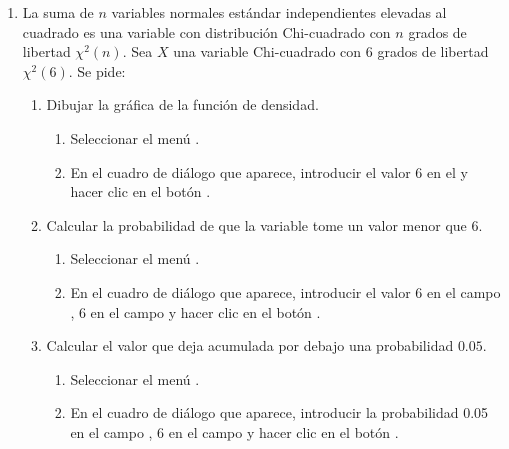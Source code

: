\begin{enumerate}[leftmargin=*]
\item La suma de $n$ variables normales estándar independientes elevadas al cuadrado es una variable con distribución Chi-cuadrado con $n$
grados de libertad $\chi^2(n)$. 
Sea $X$ una variable Chi-cuadrado con 6 grados de libertad $\chi^2(6)$. 
Se pide:
\begin{enumerate}
\item Dibujar la gráfica de la función de densidad. 
\begin{indicacion}{
\begin{enumerate}
\item Seleccionar el menú .
\item En el cuadro de diálogo que aparece, introducir el valor 6 en el  y hacer clic en el
botón .
\end{enumerate}}
\end{indicacion}

\item Calcular la probabilidad de que la variable tome un valor menor que 6.
\begin{indicacion}{
\begin{enumerate}
\item Seleccionar el menú .
\item En el cuadro de diálogo que aparece, introducir el valor $6$ en el campo , 6 en
el campo  y hacer clic en el botón .
\end{enumerate}}
\end{indicacion}

\item Calcular el valor que deja acumulada por debajo una probabilidad $0.05$.
\begin{indicacion}{
\begin{enumerate}
\item Seleccionar el menú .
\item En el cuadro de diálogo que aparece, introducir la probabilidad 0.05 en el campo , 6 en
el campo  y hacer clic en el botón .
\end{enumerate}}
\end{indicacion}


\end{enumerate}
\end{enumerate}
